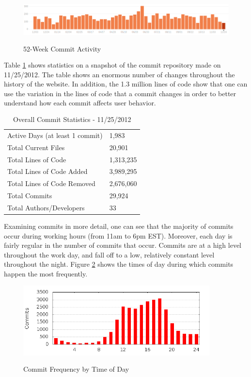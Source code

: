 \documentclass[10pt]{report}
\begin{document}
\begin{figure}[h!]
\centering
\caption{52-Week Commit Activity}
\includegraphics[width=5in]{pictures/commit-activity.png}
\label{fig:commit-history}
\end{figure}

Table \ref{table:commit-stats} shows statistics on a snapshot of the commit repository made on 11/25/2012. The table shows an enormous number of changes throughout the history of the website. In addition, the 1.3 million lines of code show that one can use the variation in the lines of code that a commit changes in order to better understand how each commit affects user behavior.

\begin{table}[h!]
\centering
\caption{Overall Commit Statistics - 11/25/2012}
\begin{tabular}{l || l }
\hline
Active Days (at least 1 commit) & 1,983 \\
Total Current Files & 20,901 \\
Total Lines of Code & 1,313,235 \\
Total Lines of Code Added & 3,989,295 \\
Total Lines of Code Removed & 2,676,060 \\
Total Commits & 29,924 \\
Total Authors/Developers & 33 \\
\hline
\end{tabular}
\label{table:commit-stats}
\end{table}

Examining commits in more detail, one can see that the majority of commits occur during working hours (from 11am to 6pm EST). Moreover, each day is fairly regular in the number of commits that occur. Commits are at a high level throughout the work day, and fall off to a low, relatively constant level throughout the night. Figure \ref{fig:commit-hours} shows the times of day during which commits happen the most frequently. 

\begin{figure}[h!]
\centering
\caption{Commit Frequency by Time of Day}
\includegraphics[width=4in]{pictures/commit-hours.png}
\label{fig:commit-hours}
\end{figure}
\end{document}
